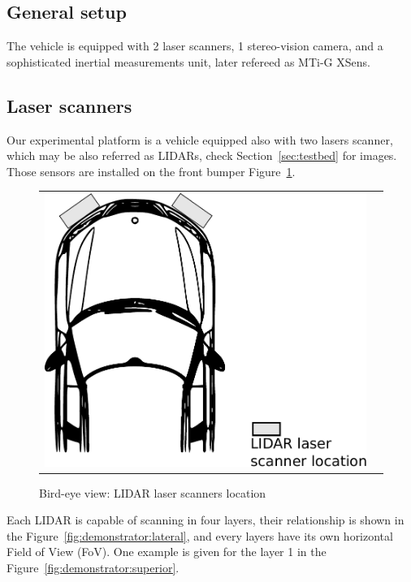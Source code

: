 \subsection{General setup}
 
The vehicle is equipped with 2 laser scanners, 1 stereo-vision camera, and a sophisticated inertial measurements unit, later refereed as MTi-G XSens.
 
\subsection{Laser scanners}

Our experimental platform is a vehicle equipped also with two lasers scanner, which may be also referred  as LIDARs, check Section~\ref{sec:testbed} for images. Those sensors are installed on the front bumper Figure~\ref{fig:demonstrator:birdeye}.

\begin{figure}[h]
   \centering
     \begin{tabular}{lr}
       \includegraphics[scale=0.3]{img/fig:demonstrator:birdeye}
     \end{tabular}
   \caption{Bird-eye view: LIDAR laser scanners location}
   \label{fig:demonstrator:birdeye}
\end{figure}

Each LIDAR is capable of scanning in four layers, their relationship is shown  in the Figure~\ref{fig:demonstrator:lateral}, and every layers have its own horizontal Field of View (FoV). One example is given for the layer 1 in the Figure~\ref{fig:demonstrator:superior}.

